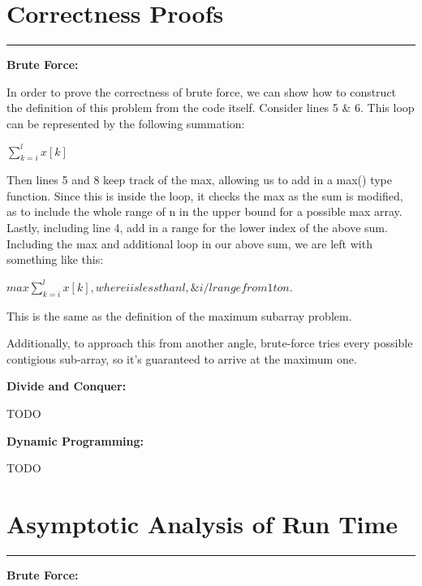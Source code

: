 \documentclass[letterpaper,10pt,titlepage,fleqn]{article}
\begin{document}
\lstset{ numbers=none }

\section*{Correctness Proofs}
\hrule

\begin{centering}
\textbf{Brute Force:}
\end{centering}

In order to prove the correctness of brute force, we can show how to construct the definition of this problem from the code itself. Consider lines 5 \& 6. This loop can be represented by the following summation:

$\sum\limits_{k=i}^{l} x[k]$

Then lines 5 and 8 keep track of the max, allowing us to add in a max() type function. Since this is inside the loop, it checks the max as the sum is modified, as to include the whole range of n in the upper bound for a possible max array. Lastly, including line 4, add in a range for the lower index of the above sum. Including the max and additional loop in our above sum, we are left with something like this:

$max \sum\limits_{k=i}^{l} x[k], where i is less than l, \& i/l range from 1 to n.$

This is the same as the definition of the maximum subarray problem.

Additionally, to approach this from another angle, brute-force tries every possible contigious sub-array, so it's guaranteed to arrive at the maximum one.

\begin{centering}
\textbf{Divide and Conquer:}
\end{centering}


TODO

\begin{centering}
\textbf{Dynamic Programming:}
\end{centering}


TODO

\section*{Asymptotic Analysis of Run Time}
\hrule

\begin{centering}
\textbf{Brute Force:}
\end{centering}
\end{document}

